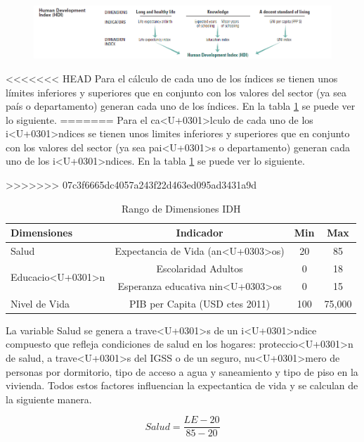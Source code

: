\documentclass{article}
\begin{document}
\begin{figure}[h]
\centering
\includegraphics{hdiCalc}
\label {IDH}
\end{figure}

<<<<<<< HEAD
Para el cálculo de cada uno de los índices se tienen unos límites inferiores y superiores que en conjunto con los valores del sector (ya sea país o departamento) generan cada uno de los índices. En la tabla \ref{Tabla 1:} se puede ver lo siguiente.
=======
Para el ca<U+0301>lculo de cada uno de los i<U+0301>ndices se tienen unos limites inferiores y superiores que en conjunto con los valores del sector (ya sea pai<U+0301>s o departamento) generan cada uno de los i<U+0301>ndices. En la tabla \ref{Tabla 1:} se puede ver lo siguiente.

>>>>>>> 07c3f6665dc4057a243f22d463ed095ad3431a9d

\begin{table}[h!]
\centering
  \begin{tabular}{l c c c}
  \hline
  Dimensiones & Indicador & Min & Max \\ [0.25ex]
  \hline \hline
  Salud & Expectancia de Vida (an<U+0303>os) & 20 & 85 \\
  \multirow{2}{*}{Educacio<U+0301>n} & Escolaridad Adultos & 0 & 18 \\ 
   & Esperanza educativa nin<U+0303>os & 0 & 15 \\
  Nivel de Vida  & PIB per Capita (USD ctes 2011) & 100 & 75,000 \\
  \hline
  \end{tabular}
 \caption {Rango de Dimensiones IDH}
  \label{Tabla 1:}
\end {table} 

La variable Salud se genera a trave<U+0301>s de un i<U+0301>ndice compuesto que refleja condiciones de salud en los hogares: proteccio<U+0301>n de salud, a trave<U+0301>s del IGSS o de un seguro, nu<U+0301>mero de personas por dormitorio, tipo de acceso a agua y saneamiento y tipo de piso en la vivienda. Todos estos factores influencian la expectantica de vida y se calculan de la siguiente manera.

\[ Salud=\frac{LE-20} {85-20} \]
\end{document}
